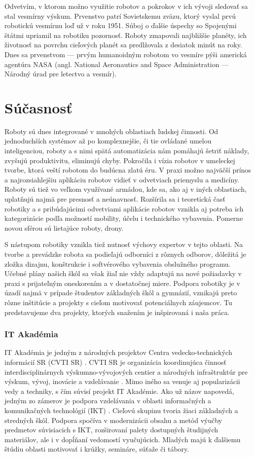 Odvetvím, v ktorom možno využitie robotov a pokrokov v ich vývoji sledovať sa stal vesmírny výskum. Prvenstvo patrí Sovietskemu zväzu, ktorý vyslal prvú robotickú vesmírnu loď už v roku 1951. Súboj o ďalšie úspechy so Spojenými štátmi upriamil na robotiku pozornosť. Roboty zmapovali najbližšie planéty, ich životnosť na povrchu cieľových planét sa predlžovala z desiatok minút na roky. Dnes sa prvenstvom --- prvým humanoidným robotom vo vesmíre pýši americká agentúra NASA (angl. National Aeronautics and Space Administration --- Národný úrad pre letectvo a vesmír).

\section{Súčasnosť}
Roboty sú dnes integrované v mnohých oblastiach ľudskej činnosti. Od jednoduchších systémov až po komplexnejšie, či tie ovládané umelou inteligenciou, roboty a s nimi spätá automatizácia nám pomáhajú šetriť náklady, zvyšujú produktivitu, eliminujú chyby. Pokročila i vízia robotov v umeleckej tvorbe, ktorá veští robotom do budúcna zlatú éru. V praxi možno najväčší prínos a najrozsiahlejšiu aplikáciu robotov vidieť v odvetviach priemyslu a medicíny. Roboty sú tiež vo veľkom využívané armádou, kde sa, ako aj v iných oblastiach, uplatňujú najmä pre presnosť a neúnavnosť. Rozšírila sa i teoretická časť robotiky a s pribúdajúcimi odvetviami aplikácie robotov vznikla aj potreba ich kategorizácie podľa možností mobility, účelu i technického vybavenia. Pomerne novou sférou sú lietajúce roboty, drony.

S nástupom robotiky vznikla tiež nutnosť výchovy expertov v tejto oblasti. Na tvorbe a prevádzke robota sa podieľajú odborníci z rôznych odborov, dôležitá je zložka dizajnu, konštrukcie i softvérového vybavenia obslužného programu. Učebné plány našich škôl sa však žiaľ nie vždy adaptujú na nové požiadavky v praxi s prijateľným oneskorením a v dostatočnej miere. Podpora robotiky je v úzadí najmä v prípade študentov základných škôl a gymnázií, vznikajú preto rôzne inštitúcie a projekty s cieľom motivovať potenciálnych záujemcov. Tu predstavujeme dva projekty, ktorých snažením je inšpirovaná i naša práca.

\subsubsection*{IT Akadémia}
IT Akadémia je jedným z národných projektov Centra vedecko-technických informácií SR (CVTI SR) \cite{CVTISR-ITAkademia}. CVTI SR je organizácia koordinujúca činnosť interdisciplinárnych výskumno-vývojových centier a národných infraštruktúr pre výskum, vývoj, inovácie a vzdelávanie \cite{CVTISR}. Mimo iného sa venuje aj popularizácii vedy a techniky, s čím súvisí projekt IT Akadémie. Ako už názov napovedá, jedným zo zámerov je podpora vzdelávania v oblasti informačných a komunikačných technológií (IKT) \cite{ITAkademia}. Cieľovú skupinu tvoria žiaci základných a stredných škôl. Podpora spočíva v modernizácii obsahu a metód výučby predmetov súvisiacich s IKT, rozširovaní palety dostupných študijných materiálov, ale i v dopĺňaní vedomostí vyučujúcich. Mladých majú k ďalšiemu štúdiu oblasti motivovať i krúžky, semináre, súťaže či tábory.

